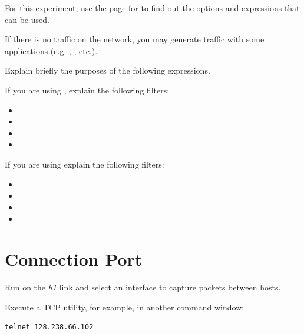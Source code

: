 \documentclass{../UTNetLab}
\begin{document}
For this experiment, use the  page for  to find out the options and
expressions that can be used.

If there is no traffic on the network, you may generate traffic with some applications
(e.g. , , etc.).

\begin{report}
    \item Explain briefly the purposes of the following  expressions.
\end{report}

If you are using , explain the following filters:
\begin{itemize}
    \item {}
    \item {}
    \item {}
    \item {}
\end{itemize}

If you are using  explain the following filters:
\begin{itemize}
    \item {}
    \item {}
    \item {}
    \item {}
\end{itemize}

\section{Connection Port}
Run  on the \textit{h1} link and select an interface to capture packets between hosts.

Execute a TCP utility,  for example, in another command window:

\begin{lstlisting}
telnet 128.238.66.102
\end{lstlisting}
\end{document}
